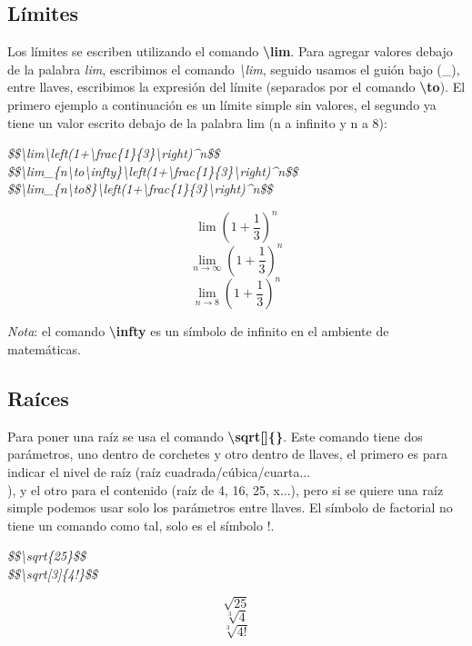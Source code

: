 \subsection{Límites}
\hspace{0.55cm}Los límites se escriben utilizando el comando \textbf{\textbackslash{lim}}. Para agregar valores debajo de la palabra \textit{lim}, escribimos el comando \textit{\textbackslash{lim}}, seguido usamos el guión bajo (\_), entre llaves, escribimos la expresión del límite (separados por el comando \textbf{\textbackslash{to}}). El primero ejemplo a continuación es  un límite simple sin valores, el segundo ya tiene un valor escrito debajo de la palabra lim (n a infinito y n a 8):
\begin{center}
    \textit{
        \$\$\textbackslash{lim}\textbackslash{left}(1+\textbackslash{frac\{1\}\{3\}}\textbackslash{right})\textasciicircum n\$\$ \\
        \$\$\textbackslash{lim}\_\{n\textbackslash{to}\textbackslash{infty}\}\textbackslash{left}(1+\textbackslash{frac\{1\}\{3\}}\textbackslash{right})\textasciicircum n\$\$ \\
        \$\$\textbackslash{lim}\_\{n\textbackslash{to}8\}\textbackslash{left}(1+\textbackslash{frac\{1\}\{3\}}\textbackslash{right})\textasciicircum n\$\$
    }
\end{center}
$$\lim \left(1+\frac{1}{3}\right)^n$$
$$\lim_{n\to\infty} \left(1+\frac{1}{3}\right)^n$$
$$\lim_{n\to8} \left(1+\frac{1}{3}\right)^n$$

\textit{Nota}: el comando \textbf{\textbackslash{infty}} es un símbolo de infinito en el ambiente de matemáticas.


\subsection{Raíces}
\hspace{0.55cm}Para poner una raíz se usa el comando \textbf{\textbackslash{sqrt[]\{\}}}. Este comando tiene dos parámetros, uno dentro de corchetes y otro dentro de llaves, el primero es para indicar el nivel de raíz (raíz cuadrada/cúbica/cuarta...\\), y el otro para el contenido (raíz de 4, 16, 25, x...), pero si se quiere una raíz simple podemos usar solo los parámetros entre llaves. El símbolo de factorial no tiene un comando como tal, solo es el símbolo !.
\begin{center}
    \textit{
        \$\$\textbackslash{sqrt\{25\}}\$\$ \\
        \$\$\textbackslash{sqrt[3]\{4!\}}\$\$
    }
\end{center}
$$\sqrt{25}$$
$$\sqrt[3]{4}$$
$$\sqrt[3]{4!}$$



